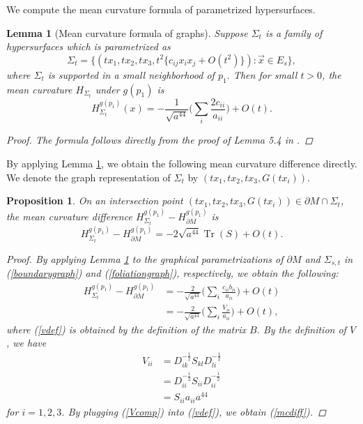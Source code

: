 \documentclass[11pt,letterpaper]{amsart}
\DeclareMathOperator{\Tr}{Tr}
\newtheorem{lem}{Lemma}[section]
\newtheorem{prop}{Proposition}[section]
\begin{document}
We compute the mean curvature formula of parametrized hypersurfaces.
\begin{lem}[Mean curvature formula of graphs] \label{graphmcformula} Suppose $\Sigma_{t}$ is a family of hypersurfaces which is parametrized as
\[
\Sigma_{t} = \{(tx_1,tx_2,tx_{3}, t^2\{c_{ij} x_{i} x_{j}+O(t^2)\}): \vec{x}\in E_s\},
\]
where $\Sigma_{t}$ is supported in a small neighborhood of $p_{1}$. Then for small $t>0$, the mean curvature $H_{\Sigma_{t}}$ under $g(p_{1})$ is
\begin{equation*}
    H_{\Sigma_{t}}^{g(p_{1})}(x) = - \frac{1}{ \sqrt{a^{44}}} \bigg( \sum_{i} \frac{2c_{ii}}{a_{ii}}\bigg) + O(t).
\end{equation*}
\begin{proof}
The formula follows directly from the proof of Lemma 5.4 in \cite{koyao}.
\end{proof}
\end{lem}
By applying Lemma \ref{graphmcformula}, we obtain the following mean curvature difference directly. We denote the graph representation of $\Sigma_{t}$ by $(tx_1,tx_2,tx_{3}, G(tx_{i}))$.
\begin{prop} \label{mccomparisong} On an intersection point $(tx_1,tx_2,tx_{3}, G(tx_{i})) \in \partial M \cap \Sigma_{t}$, the mean curvature difference $H_{\Sigma_{t}}^{g(p_{1})} - H_{\partial M}^{g(p_{1})}$ is
\begin{equation}\label{mcdiff}
  H_{\Sigma_{t}}^{g(p_{1})} - H_{\partial M}^{g(p_{1})} = -2 \sqrt{a^{44}} \Tr (S)  +O(t).  
\end{equation}
\begin{proof} By applying Lemma \ref{graphmcformula} to the graphical parametrizations of $\partial M$ and $\Sigma_{s,t}$ in (\ref{boundarygraph}) and (\ref{foliationgraph}), respectively, we obtain the following:
\begin{align}
\nonumber H_{\Sigma_{t}}^{g(p_{1})} - H_{\partial M}^{g(p_{1})}  &=  -\frac{2}{ \sqrt{a^{44}}} \bigg( \sum_{i} \frac{c_{ii}b_{ii}}{a_{ii}}\bigg) + O(t) \\ &= -\frac{2}{ \sqrt{a^{44}}} \bigg( \sum_{i} \frac{V_{ii}}{a_{ii}}\bigg) + O(t) \label{vdef},
\end{align}
where (\ref{vdef}) is obtained by the definition of the matrix $B$. By the definition of $V$, we have
\begin{align}
 \nonumber V_{ii} &= D^{-\frac{1}{2}}_{ik} S_{kl} D^{-\frac{1}{2}}_{li} \\ \nonumber &= D^{-\frac{1}{2}}_{ii} S_{ii} D^{-\frac{1}{2}}_{ii} \\ &= S_{ii}a_{ii}a^{44} \label{Vcomp}
\end{align}
for $i=1,2,3$. By plugging (\ref{Vcomp}) into (\ref{vdef}), we obtain (\ref{mcdiff}).
\end{proof}
\end{prop}
\end{document}
